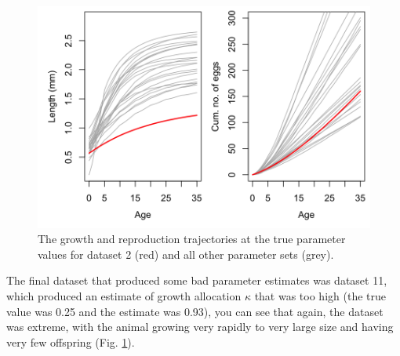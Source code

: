 \documentclass[12pt,reqno,final,pdftex]{amsart}\usepackage[]{graphicx}\usepackage[]{color}
\newenvironment{knitrout}{}{} %
\theoremstyle{plain}
\numberwithin{equation}{part}
\begin{document}
\begin{knitrout}\scriptsize
{}\color{fgcolor}\begin{figure}

\includegraphics[width=\linewidth]{figure/comparing-trajectories-2-1} \hfill{}

\caption[The growth and reproduction trajectories at the true parameter values for dataset 2 (red) and all other parameter sets (grey)]{The growth and reproduction trajectories at the true parameter values for dataset 2 (red) and all other parameter sets (grey).}\label{fig:comparing-trajectories-2}
\end{figure}


\end{knitrout}

The final dataset that produced some bad parameter estimates was dataset 11, which produced an estimate of growth allocation $\kappa$ that was too high (the true value was 0.25 and the estimate was 0.93), you can see that again, the dataset was extreme, with the animal growing very rapidly to very large size and having very few offspring (Fig. \ref{fig:comparing-trajectories-2}).
\end{document}
